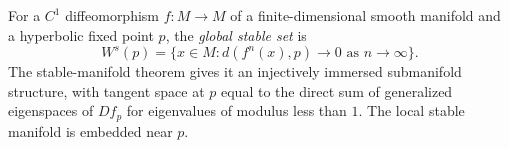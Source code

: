 
For a $C^1$ diffeomorphism $f:M\to M$ of a finite-dimensional smooth manifold and a hyperbolic fixed point $p$, the \emph{global stable set} is
\[
W^s(p)=\{x\in M:d(f^n(x),p)\to0\text{ as }n\to\infty\}.
\]
The stable-manifold theorem gives it an injectively immersed submanifold structure, with tangent space at $p$ equal to the direct sum of generalized eigenspaces of $Df_p$ for eigenvalues of modulus less than $1$. The local stable manifold is embedded near $p$.
